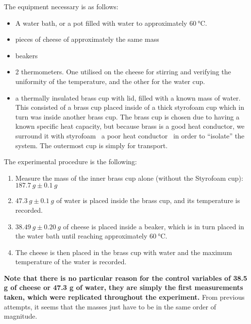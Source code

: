 The equipment necessary is as follows:
\begin{itemize}
	\item A water bath, or a pot filled with water to approximately $\SI{60}{\celsius}$.
	\item pieces of cheese of approximately the same mass
	\item beakers
	\item 2 thermometers. One utilised on the cheese for stirring and verifying the uniformity of the temperature, and the other for the water cup.
	\item a thermally insulated brass cup with lid, filled with a known mass of water. This consisted of a brass cup placed inside of a thick styrofoam cup which in turn was inside another brass cup. The brass cup is chosen due to having a known specific heat capacity, but because brass is a good heat conductor, we surround it with styrofoam \textendash\ a poor heat conductor \textendash\ in order to ``isolate'' the system. The outermost cup is simply for transport.
\end{itemize}

The experimental procedure is the following:
\begin{enumerate}
	\item Measure the mass of the inner brass cup alone (without the Styrofoam cup): $\SI{187.7}{g} \pm \SI{0.1}{g}$
	\item $\SI{47.3}{g} \pm \SI{0.1}{g}$ of water is placed inside the brass cup, and its temperature is recorded.
	\item $\SI{38.49}{g} \pm \SI{0.20}{g}$ of cheese is placed inside a beaker, which is in turn placed in the water bath until reaching approximately $\SI{60}{\celsius}$.
	\item The cheese is then placed in the brass cup with water and the maximum temperature of the water is recorded.
\end{enumerate}

\textbf{Note that there is no particular reason for the control variables of 38.5 g of cheese or 47.3 g of water, they are simply the first measurements taken, which were replicated throughout the experiment.} From previous attempts, it seems that the masses just have to be in the same order of magnitude.

